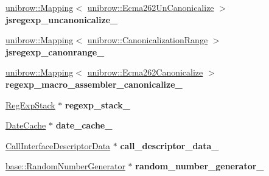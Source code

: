 \begin{DoxyCompactItemize}
\item 
\hyperlink{classunibrow_1_1_mapping}{unibrow\+::\+Mapping}$<$ \hyperlink{structunibrow_1_1_ecma262_un_canonicalize}{unibrow\+::\+Ecma262\+Un\+Canonicalize} $>$ {\bfseries jsregexp\+\_\+uncanonicalize\+\_\+}\hypertarget{classv8_1_1internal_1_1_isolate_aa560667773f2b3c0f2d5c9c69e5b43ee}{}\label{classv8_1_1internal_1_1_isolate_aa560667773f2b3c0f2d5c9c69e5b43ee}

\item 
\hyperlink{classunibrow_1_1_mapping}{unibrow\+::\+Mapping}$<$ \hyperlink{structunibrow_1_1_canonicalization_range}{unibrow\+::\+Canonicalization\+Range} $>$ {\bfseries jsregexp\+\_\+canonrange\+\_\+}\hypertarget{classv8_1_1internal_1_1_isolate_a4d46073f33379895417ad38afa38ea06}{}\label{classv8_1_1internal_1_1_isolate_a4d46073f33379895417ad38afa38ea06}

\item 
\hyperlink{classunibrow_1_1_mapping}{unibrow\+::\+Mapping}$<$ \hyperlink{structunibrow_1_1_ecma262_canonicalize}{unibrow\+::\+Ecma262\+Canonicalize} $>$ {\bfseries regexp\+\_\+macro\+\_\+assembler\+\_\+canonicalize\+\_\+}\hypertarget{classv8_1_1internal_1_1_isolate_aae5a5a1d176ace014fa5902550a1f4f2}{}\label{classv8_1_1internal_1_1_isolate_aae5a5a1d176ace014fa5902550a1f4f2}

\item 
\hyperlink{classv8_1_1internal_1_1_reg_exp_stack}{Reg\+Exp\+Stack} $\ast$ {\bfseries regexp\+\_\+stack\+\_\+}\hypertarget{classv8_1_1internal_1_1_isolate_a254bcaa900558a376d43a69ab42d5b33}{}\label{classv8_1_1internal_1_1_isolate_a254bcaa900558a376d43a69ab42d5b33}

\item 
\hyperlink{classv8_1_1internal_1_1_date_cache}{Date\+Cache} $\ast$ {\bfseries date\+\_\+cache\+\_\+}\hypertarget{classv8_1_1internal_1_1_isolate_a32b3564ffb3facb58d164c9b681d1463}{}\label{classv8_1_1internal_1_1_isolate_a32b3564ffb3facb58d164c9b681d1463}

\item 
\hyperlink{classv8_1_1internal_1_1_call_interface_descriptor_data}{Call\+Interface\+Descriptor\+Data} $\ast$ {\bfseries call\+\_\+descriptor\+\_\+data\+\_\+}\hypertarget{classv8_1_1internal_1_1_isolate_ae1bda7dc3babca7b33c63a45c3b95896}{}\label{classv8_1_1internal_1_1_isolate_ae1bda7dc3babca7b33c63a45c3b95896}

\item 
\hyperlink{classv8_1_1base_1_1_random_number_generator}{base\+::\+Random\+Number\+Generator} $\ast$ {\bfseries random\+\_\+number\+\_\+generator\+\_\+}\hypertarget{classv8_1_1internal_1_1_isolate_a1469845cf36fa17e9f7e96a84594355d}{}\label{classv8_1_1internal_1_1_isolate_a1469845cf36fa17e9f7e96a84594355d}


\end{DoxyCompactItemize}
